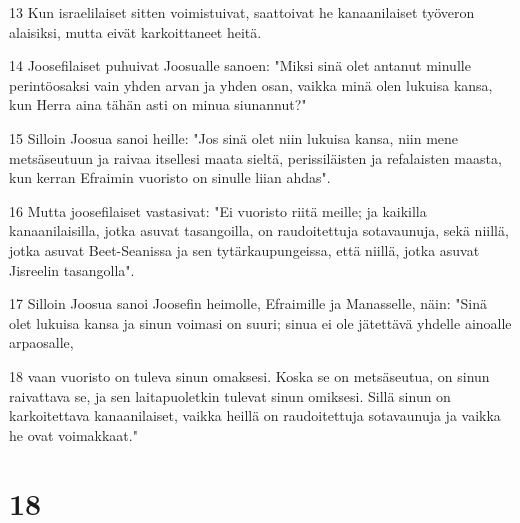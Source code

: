 \par 13 Kun israelilaiset sitten voimistuivat, saattoivat he kanaanilaiset työveron alaisiksi, mutta eivät karkoittaneet heitä.
\par 14 Joosefilaiset puhuivat Joosualle sanoen: "Miksi sinä olet antanut minulle perintöosaksi vain yhden arvan ja yhden osan, vaikka minä olen lukuisa kansa, kun Herra aina tähän asti on minua siunannut?"
\par 15 Silloin Joosua sanoi heille: "Jos sinä olet niin lukuisa kansa, niin mene metsäseutuun ja raivaa itsellesi maata sieltä, perissiläisten ja refalaisten maasta, kun kerran Efraimin vuoristo on sinulle liian ahdas".
\par 16 Mutta joosefilaiset vastasivat: "Ei vuoristo riitä meille; ja kaikilla kanaanilaisilla, jotka asuvat tasangoilla, on raudoitettuja sotavaunuja, sekä niillä, jotka asuvat Beet-Seanissa ja sen tytärkaupungeissa, että niillä, jotka asuvat Jisreelin tasangolla".
\par 17 Silloin Joosua sanoi Joosefin heimolle, Efraimille ja Manasselle, näin: "Sinä olet lukuisa kansa ja sinun voimasi on suuri; sinua ei ole jätettävä yhdelle ainoalle arpaosalle,
\par 18 vaan vuoristo on tuleva sinun omaksesi. Koska se on metsäseutua, on sinun raivattava se, ja sen laitapuoletkin tulevat sinun omiksesi. Sillä sinun on karkoitettava kanaanilaiset, vaikka heillä on raudoitettuja sotavaunuja ja vaikka he ovat voimakkaat."

\chapter{18}

